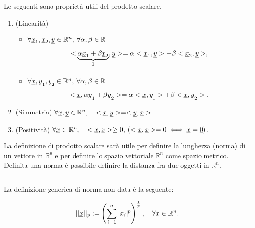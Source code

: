 Le seguenti sono proprietà utili del prodotto scalare.
\begin{property}
    \begin{enumerate}
        \item (Linearità)
        \begin{itemize}
            \item $\forall \uline x_1,\uline x_2, \uline y\in\mathbb R^n,\; \forall \alpha,\beta\in\mathbb R$
                \begin{equation*}
                    <\underbrace{\alpha\uline x_1+\beta\uline x_2}_{\footnotemark},\uline y> = \alpha<\uline x_1,\uline y>+\beta <\uline x_2,\uline y>,
                \end{equation*}
            \item $\forall\uline x, \uline y_1,\uline y_2\in\mathbb R^n,\; \forall \alpha,\beta\in\mathbb R$
                \begin{equation*}
                    <\uline x,\alpha\uline y_1+\beta\uline y_2> = \alpha<\uline x,\uline y_1>+\beta <\uline x,\uline y_2>.
                \end{equation*}
        \end{itemize}
        \item (Simmetria) $\forall \uline x, \uline y\in\mathbb R^n,\quad <\uline x,\uline y>=<\uline y, \uline x>$.
        \item (Positività) $\forall\uline x\in\mathbb R^n,\quad <\uline x,\uline x>\geq 0,\; (<\uline x,\uline x>=0\iff \uline x=\uline 0)$.
    \end{enumerate}
\end{property}

La definizione di prodotto scalare sarà utile per definire la lunghezza (norma) di un vettore in $\mathbb R^n$ e per definire lo spazio vettoriale $\mathbb R^n$ come spazio metrico. Definita una norma è possibile definire la distanza fra due oggetti in $\mathbb R^n$.

\vspace{5px}
\hrule
\vspace{5px}
La definizione generica di norma non data è la seguente:
\begin{definition}[Norma]
    \begin{equation*}
        ||\uline x||_p:=\left(\sum _{i=1}^{n}|x_{i}|^{p}\right)^{\frac {1}{p}},\quad \forall x\in\mathbb R^n.
    \end{equation*}
\end{definition}


